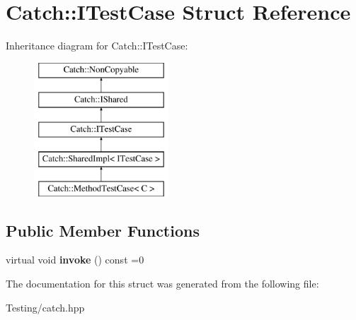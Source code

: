 \hypertarget{struct_catch_1_1_i_test_case}{\section{Catch\-:\-:I\-Test\-Case Struct Reference}
\label{struct_catch_1_1_i_test_case}
}
Inheritance diagram for Catch\-:\-:I\-Test\-Case\-:\begin{figure}[H]
\begin{center}
\leavevmode
\includegraphics[height=5.000000cm]{struct_catch_1_1_i_test_case}
\end{center}
\end{figure}
\subsection*{Public Member Functions}
\begin{DoxyCompactItemize}
\item 
\hypertarget{struct_catch_1_1_i_test_case_a678825e62e7c17297621cfeb65588c34}{virtual void {\bfseries invoke} () const =0}\label{struct_catch_1_1_i_test_case_a678825e62e7c17297621cfeb65588c34}

\end{DoxyCompactItemize}


The documentation for this struct was generated from the following file\-:\begin{DoxyCompactItemize}
\item 
Testing/catch.\-hpp\end{DoxyCompactItemize}
